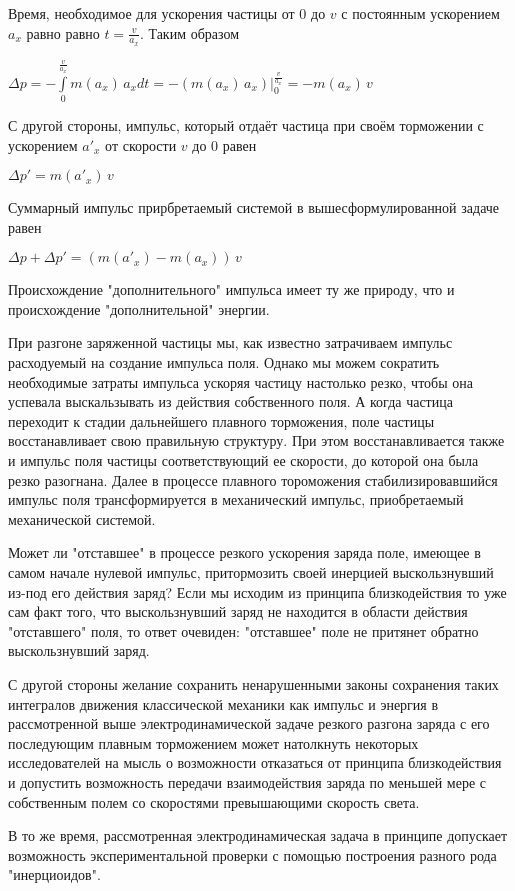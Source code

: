 \documentclass{article}
\begin{document}
Время, необходимое для ускорения частицы от $0$ до $v$ с постоянным ускорением $a_x$ равно равно $t = \frac{v}{a_x}$. Таким образом


$\Delta p = - \int\limits_{0}^{\frac{v}{a_x}} m(a_x) \, a_x dt = -\left(m(a_x) \, a_x\right)\Big|_{0}^{\frac{v}{a_x}} = - m(a_x)\,v$

С другой стороны, импульс, который отдаёт частица при своём торможении с ускорением $a'_x$ от скорости $v$ до $0$ равен

$\Delta p' = m(a'_x)\,v$

Суммарный импульс прирбретаемый системой в вышесформулированной задаче равен

$\Delta p + \Delta p' = \left(m(a'_x) - m(a_x)\right)\,v$

Происхождение "дополнительного" импульса имеет ту же природу, что и происхождение "дополнительной" энергии.

При разгоне заряженной частицы мы, как известно затрачиваем импульс расходуемый на создание импульса поля. Однако мы можем сократить необходимые затраты импульса ускоряя частицу настолько резко, чтобы она успевала выскальзывать из действия собственного поля. А когда частица переходит к стадии дальнейшего плавного торможения, поле частицы восстанавливает свою правильную структуру. При этом восстанавливается также и импульс поля частицы соответствующий ее скорости, до которой она была резко разогнана. Далее в процессе плавного тороможения стабилизировавшийся импульс поля трансформируется в механический импульс, приобретаемый механической системой.

Может ли "отставшее" в процессе резкого ускорения заряда поле, имеющее в самом начале нулевой импульс, притормозить своей инерцией выскользнувший из-под его действия заряд? Если мы исходим из принципа близкодействия то уже сам факт того, что выскользнувший заряд не находится в области действия "отставшего" поля, то ответ очевиден: "отставшее" поле не притянет обратно выскользнувший заряд.

С другой стороны желание сохранить ненарушенными законы сохранения таких интегралов движения классической механики как импульс и энергия в рассмотренной выше электродинамической задаче резкого разгона заряда с его последующим плавным торможением может натолкнуть некоторых исследователей на мысль о возможности отказаться от принципа близкодействия и допустить возможность передачи взаимодействия заряда по меньшей мере с собственным полем со скоростями превышающими скорость света.

В то же время, рассмотренная электродинамическая задача в принципе допускает возможность экспериментальной проверки с помощью построения разного рода "инерциоидов".
\end{document}
